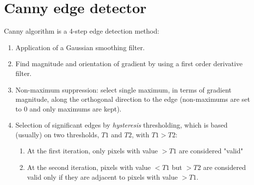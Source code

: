 \begin{itemize}
\begin{center}
\begin{figure}[ht]
\begin{minipage}{0.45\linewidth}
        \end{minipage}
        \hspace{5pt}
        \begin{minipage}{0.45\linewidth}
        \centering
        \end{minipage}
    \end{figure}
    \end{center}
\end{itemize}
\section{Canny edge detector}
Canny algorithm is a 4-step edge detection method:
\begin{enumerate}
    \item Application of a Gaussian smoothing filter.
    \item Find magnitude and orientation of gradient by using a first order derivative filter.
    \item Non-maximum suppression: select single maximum, in terms of gradient magnitude, along the orthogonal direction to the edge (non-maximums are set to 0 and only maximums are kept).
    \item Selection of significant edges by \textit{hysteresis} thresholding, which is based (usually) on two thresholds, $T1$ and $T2$, with $T1 > T2$:
    \begin{enumerate}
        \item At the first iteration, only pixels with value $> T1$ are considered "valid"
        \item At the second iteration, pixels with value $< T1$ but $> T2$ are considered valid only if they are adjacent to pixels with value $> T1$.
    \end{enumerate}
\end{enumerate}
